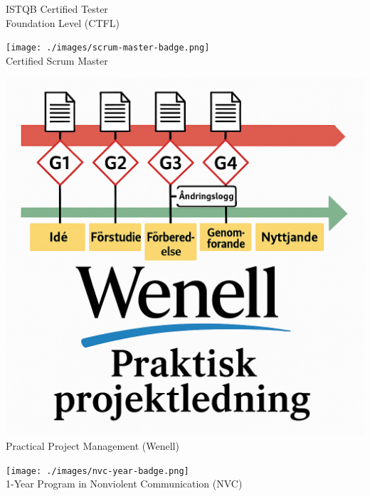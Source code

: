 \documentclass[11pt,a4paper,sans]{moderncv}
\begin{document}
{\begin{minipage}[t]{0.24\linewidth}
    \scriptsize ISTQB Certified Tester \\
    Foundation Level (CTFL)
  \end{minipage}
  \hfill
  \begin{minipage}[t]{0.24\linewidth}
    \centering
    \texttt{[image: ./images/scrum-master-badge.png]}\\
    \scriptsize Certified Scrum Master
  \end{minipage}
  \hfill
  \begin{minipage}[t]{0.24\linewidth}
    \centering
    \includegraphics[width=0.9\linewidth]{./images/wenell-ppl-badge.png}\\
    \scriptsize Practical Project Management (Wenell)
  \end{minipage}
  \hfill
  \begin{minipage}[t]{0.24\linewidth}
    \centering
    \texttt{[image: ./images/nvc-year-badge.png]}\\
    \scriptsize 1-Year Program in Nonviolent Communication (NVC)
  \end{minipage}
}

 



%


%

\end{document}
